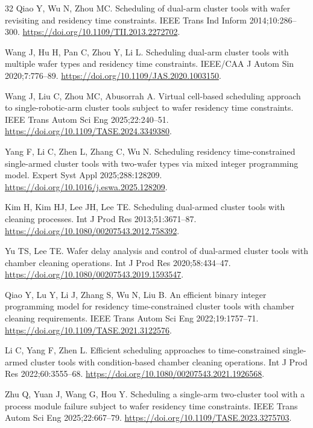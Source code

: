 \documentclass[final,5p,times,twocolumn]{elsarticle}
\begin{document}
\begin{thebibliography}{32}
Qiao Y, Wu N, Zhou MC. Scheduling of dual-arm cluster tools with wafer revisiting and residency time constraints.
IEEE Trans Ind Inform 2014;10:286--300.
\url{https://doi.org/10.1109/TII.2013.2272702}.

Wang J, Hu H, Pan C, Zhou Y, Li L. Scheduling dual-arm cluster tools with multiple wafer types and residency time constraints.
IEEE/CAA J Autom Sin 2020;7:776--89.
\url{https://doi.org/10.1109/JAS.2020.1003150}.

Wang J, Liu C, Zhou MC, Abusorrah A. Virtual cell-based scheduling approach to single-robotic-arm cluster tools subject to wafer residency time constraints.
IEEE Trans Autom Sci Eng 2025;22:240--51.
\url{https://doi.org/10.1109/TASE.2024.3349380}.

Yang F, Li C, Zhen L, Zhang C, Wu N. Scheduling residency time-constrained single-armed cluster tools with two-wafer types via mixed integer programming model.
Expert Syst Appl 2025;288:128209.
\url{https://doi.org/10.1016/j.eswa.2025.128209}.

Kim H, Kim HJ, Lee JH, Lee TE. Scheduling dual-armed cluster tools with cleaning processes.
Int J Prod Res 2013;51:3671--87.
\url{https://doi.org/10.1080/00207543.2012.758392}.

Yu TS, Lee TE. Wafer delay analysis and control of dual-armed cluster tools with chamber cleaning operations.
Int J Prod Res 2020;58:434--47.
\url{https://doi.org/10.1080/00207543.2019.1593547}.

Qiao Y, Lu Y, Li J, Zhang S, Wu N, Liu B. An efficient binary integer programming model for residency time-constrained cluster tools with chamber cleaning requirements.
IEEE Trans Autom Sci Eng 2022;19:1757--71.
\url{https://doi.org/10.1109/TASE.2021.3122576}.

Li C, Yang F, Zhen L. Efficient scheduling approaches to time-constrained single-armed cluster tools with condition-based chamber cleaning operations.
Int J Prod Res 2022;60:3555--68.
\url{https://doi.org/10.1080/00207543.2021.1926568}.

Zhu Q, Yuan J, Wang G, Hou Y. Scheduling a single-arm two-cluster tool with a process module failure subject to wafer residency time constraints.
IEEE Trans Autom Sci Eng 2025;22:667--79.
\url{https://doi.org/10.1109/TASE.2023.3275703}.


\end{thebibliography}
\end{document}
